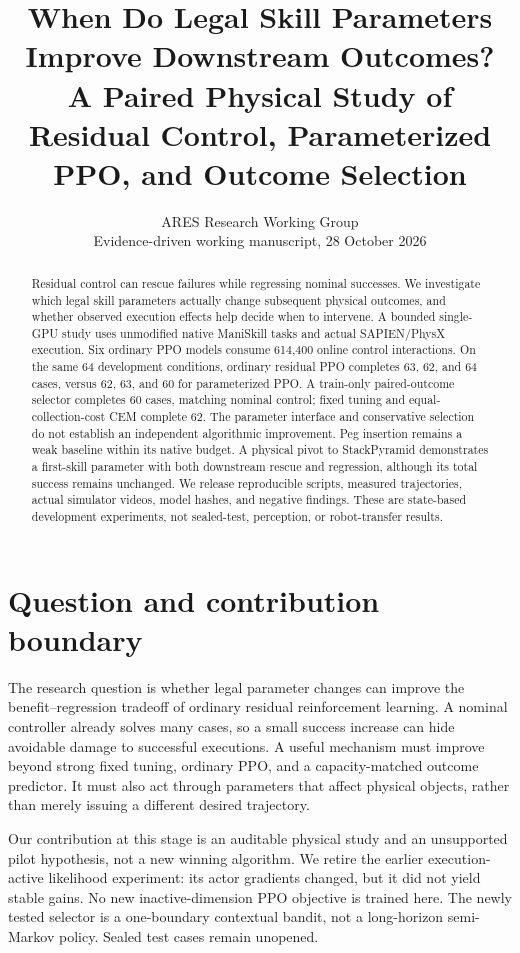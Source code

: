 \documentclass[10pt,a4paper,twocolumn]{article}
\title{When Do Legal Skill Parameters Improve Downstream Outcomes?\\\large A Paired Physical Study of Residual Control, Parameterized PPO, and Outcome Selection}
\author{ARES Research Working Group\\\small Evidence-driven working manuscript, 28 October 2026}
\date{}
\begin{document}
\maketitle
\begin{abstract}
Residual control can rescue failures while regressing nominal successes. We investigate which legal skill parameters actually change subsequent physical outcomes, and whether observed execution effects help decide when to intervene. A bounded single-GPU study uses unmodified native ManiSkill tasks and actual SAPIEN/PhysX execution. Six ordinary PPO models consume 614,400 online control interactions. On the same 64 development conditions, ordinary residual PPO completes 63, 62, and 64 cases, versus 62, 63, and 60 for parameterized PPO. A train-only paired-outcome selector completes 60 cases, matching nominal control; fixed tuning and equal-collection-cost CEM complete 62. The parameter interface and conservative selection do not establish an independent algorithmic improvement. Peg insertion remains a weak baseline within its native budget. A physical pivot to StackPyramid demonstrates a first-skill parameter with both downstream rescue and regression, although its total success remains unchanged. We release reproducible scripts, measured trajectories, actual simulator videos, model hashes, and negative findings. These are state-based development experiments, not sealed-test, perception, or robot-transfer results.
\end{abstract}

\section{Question and contribution boundary}
The research question is whether legal parameter changes can improve the benefit--regression tradeoff of ordinary residual reinforcement learning. A nominal controller already solves many cases, so a small success increase can hide avoidable damage to successful executions. A useful mechanism must improve beyond strong fixed tuning, ordinary PPO, and a capacity-matched outcome predictor. It must also act through parameters that affect physical objects, rather than merely issuing a different desired trajectory.

Our contribution at this stage is an auditable physical study and an unsupported pilot hypothesis, not a new winning algorithm. We retire the earlier execution-active likelihood experiment: its actor gradients changed, but it did not yield stable gains. No new inactive-dimension PPO objective is trained here. The newly tested selector is a one-boundary contextual bandit, not a long-horizon semi-Markov policy. Sealed test cases remain unopened.
\end{document}
